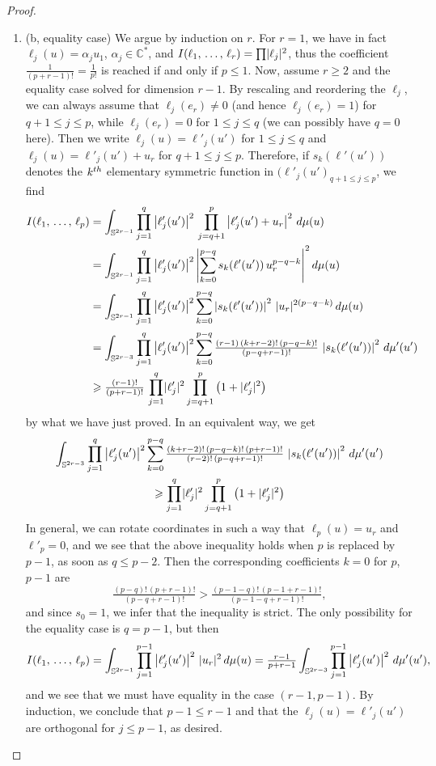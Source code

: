 \documentclass[10pt,a4paper]{amsart}
\numberwithin{equation}{section}
\DeclarePairedDelimiter{\abs}{\lvert}{\rvert}
\newcommand*\bC{\mathbb{C}}
\newcommand*\bS{\mathbb{S}}
\let\leq\leqslant
\let\geq\geqslant
\theoremstyle{definition}\newtheorem{defi}[theo]{Definition}
\theoremstyle{remark}\newtheorem{rema}[theo]{Remark}
\begin{document}
\begin{proof}
\begin{enumerate}
\item (b, equality case) We argue by induction on $r$. For $r=1$, we have in fact $\ell_j(u)=\alpha_ju_1$, $\alpha_j\in\bC^*$, and
$I(\ell_1,\,\dotsc,\,\ell_r)=\prod\abs{\ell_j}^2$, thus the coefficient $\tfrac{1}{ (p+r-1)!}=\tfrac{1}{ p!}$ is reached if and only if $p\leq 1$. Now, assume $r\geq 2$ and the equality case solved for dimension $r-1$. By rescaling and reordering the $\ell_j$, we can always assume that $\ell_j(e_r)\ne 0$ (and hence
$\ell_j(e_r)=1$) for $q+1\leq j\leq p$, while $\ell_j(e_r)=0$ for
$1\leq j\leq q$ (we can possibly have $q=0$ here). Then we write
$\ell_j(u)=\ell'_j(u')$ for $1\leq j\leq q$ and
$\ell_j(u)=\ell'_j(u')+u_r$ for $q+1\leq j\leq p$. Therefore, if
$s_k(\ell'(u'))$ denotes the $k^{\rm th}$ elementary symmetric function in
$(\ell'_j(u')_{q+1\leq j\leq p}$, we find
\begin{align*}
I(\ell_1,\,\dotsc,\,\ell_p) &=\int_{\bS^{2r-1}}\prod_{j=1}^q\left|\ell'_j(u')\right|^2\,
\prod_{j=q+1}^p\left|\ell'_j(u')+u_r\right|^2\,d\mu(u)\\
&=\int_{\bS^{2r-1}}\prod_{j=1}^q\left|\ell'_j(u')\right|^2
\left|\sum_{k=0}^{p-q}s_k(\ell'(u'))\,u_r^{p-q-k}\right|^2 d\mu(u)
\\
&=\int_{\bS^{2r-1}}\prod_{j=1}^q\left|\ell'_j(u')\right|^2
\sum_{k=0}^{p-q}
\left|s_k(\ell'(u'))\right|^2\,\abs{u_r}^{2(p-q-k)}\,d\mu(u)\\
&=\int_{\bS^{2r-3}}\prod_{j=1}^q\left|\ell'_j(u')\right|^2
\sum_{k=0}^{p-q}\tfrac{(r-1)\,(k+r-2)!\,(p-q-k)!}{(p-q+r-1)!}\,
\left|s_k(\ell'(u'))\right|^2\,d\mu'(u')\\
&\geq\tfrac{(r-1)!}{(p+r-1)!}\,\prod_{j=1}^q\abs{\ell'_j}^2
\prod_{j=q+1}^p\left(1+\abs{\ell'_j}^2\right)
\end{align*}
by what we have just proved. In an equivalent way, we get
\begin{multline*}
\int_{\bS^{2r-3}}\prod_{j=1}^q\left|\ell'_j(u')\right|^2
\sum_{k=0}^{p-q}\tfrac{(k+r-2)!\,(p-q-k)!\,(p+r-1)!}{(r-2)!\,(p-q+r-1)!}\,
\left|s_k(\ell'(u'))\right|^2\,d\mu'(u')
\\
\geq\prod_{j=1}^q\abs{\ell'_j}^2
\prod_{j=q+1}^p\left(1+\abs{\ell'_j}^2\right)
\end{multline*}
In general, we can rotate coordinates in such a way that $\ell_p(u)=u_r$ and $\ell'_p=0$, and we see that the above inequality holds when $p$ is replaced by $p-1$, as soon as $q\leq p-2$. Then the corresponding coefficients $k=0$ for $p$, $p-1$ are
\[
\tfrac{(p-q)!\,(p+r-1)!}{(p-q+r-1)!}>\tfrac{(p-1-q)!\,(p-1+r-1)!}{(p-1-q+r-1)!},
\]
and since $s_0=1$, we infer that the inequality is strict. The only possibility for the equality case is $q=p-1$, but then
\[
I(\ell_1,\,\dotsc,\,\ell_p)=
\int_{\bS^{2r-1}}\prod_{j=1}^{p-1}\left|\ell'_j(u')\right|^2\,\abs{u_r}^2\,d\mu(u)=
\tfrac{r-1}{ p+r-1}\int_{\bS^{2r-3}}\prod_{j=1}^{p-1}\left|\ell'_j(u')\right|^2\,d\mu'(u'),
\]
and we see that we must have equality in the case $(r-1,p-1)$. By induction, we conclude that $p-1\leq r-1$ and that the
$\ell_j(u)=\ell'_j(u')$ are orthogonal for $j\leq p-1$, as desired.\qedhere
\end{enumerate}
\end{proof}
\end{document}
